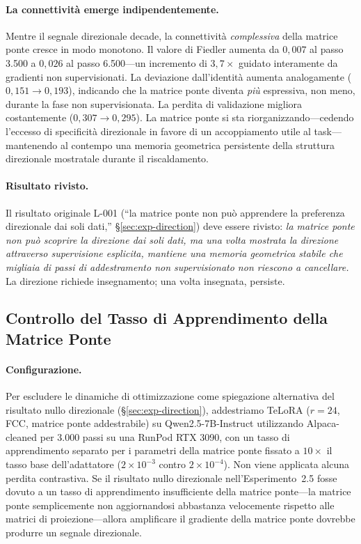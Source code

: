 \documentclass[11pt]{article}
\begin{document}
\paragraph{La connettivit\`a emerge indipendentemente.}
Mentre il segnale direzionale decade, la connettivit\`a
\emph{complessiva} della matrice ponte cresce in modo monotono. Il
valore di Fiedler aumenta da $0{,}007$ al passo 3.500 a $0{,}026$ al
passo 6.500---un incremento di $3{,}7\times$ guidato interamente da
gradienti non supervisionati. La deviazione dall'identit\`a aumenta
analogamente ($0{,}151 \to 0{,}193$), indicando che la matrice ponte
diventa \emph{pi\`u} espressiva, non meno, durante la fase non
supervisionata. La perdita di validazione migliora costantemente
($0{,}307 \to 0{,}295$). La matrice ponte si sta riorganizzando---cedendo
l'eccesso di specificit\`a direzionale in favore di un accoppiamento
utile al task---mantenendo al contempo una memoria geometrica persistente
della struttura direzionale mostratale durante il riscaldamento.

\paragraph{Risultato rivisto.}
Il risultato originale L-001 (``la matrice ponte non pu\`o apprendere la
preferenza direzionale dai soli dati,'' \S\ref{sec:exp-direction}) deve
essere rivisto: \emph{la matrice ponte non pu\`o scoprire la direzione
dai soli dati, ma una volta mostrata la direzione attraverso supervisione
esplicita, mantiene una memoria geometrica stabile che migliaia di passi
di addestramento non supervisionato non riescono a cancellare.} La
direzione richiede insegnamento; una volta insegnata, persiste.

\subsection{Controllo del Tasso di Apprendimento della Matrice Ponte}
\label{sec:exp-bridge-lr}

\paragraph{Configurazione.}
Per escludere le dinamiche di ottimizzazione come spiegazione
alternativa del risultato nullo direzionale
(\S\ref{sec:exp-direction}), addestriamo TeLoRA ($r\!=\!24$, FCC,
matrice ponte addestrabile) su Qwen2.5-7B-Instruct utilizzando
Alpaca-cleaned per 3.000 passi su una RunPod RTX 3090, con un tasso di
apprendimento separato per i parametri della matrice ponte fissato a
$10\times$ il tasso base dell'adattatore ($2 \times 10^{-3}$ contro
$2 \times 10^{-4}$). Non viene applicata alcuna perdita contrastiva. Se
il risultato nullo direzionale nell'Esperimento~2.5 fosse dovuto a un
tasso di apprendimento insufficiente della matrice ponte---la matrice
ponte semplicemente non aggiornandosi abbastanza velocemente rispetto
alle matrici di proiezione---allora amplificare il gradiente della
matrice ponte dovrebbe produrre un segnale direzionale.
\end{document}
